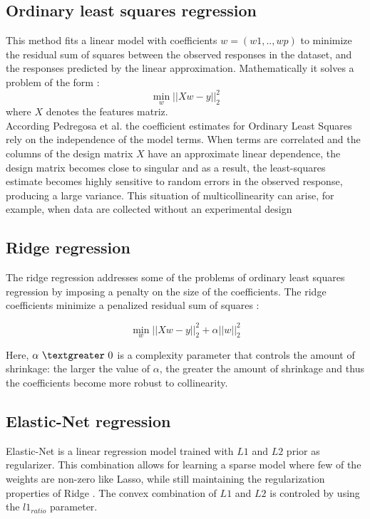 \documentclass[review,authoryear,english]{elsarticle}
\begin{document}
\subsection{Ordinary least squares regression}
This method fits a linear model with coefficients $w = (w1,..,wp)$ to minimize the residual sum of squares between the observed responses in the dataset, and the responses predicted by the linear approximation. Mathematically it solves a problem of the form \citep{scikitlearn2011}:
$$\min_{w} \Bigr| \Bigr| Xw - y \Bigr| \Bigr|_2^2  $$
where $X$ denotes the features matriz. \\
According Pedregosa et al. \citep{scikitlearn2011}  the coefficient estimates for Ordinary Least Squares rely on the independence of the model terms. When terms are correlated and the columns of the design matrix $X$ have an approximate linear dependence, the design matrix becomes close to singular and as a result, the least-squares estimate becomes highly sensitive to random errors in the observed response, producing a large variance. This situation of multicollinearity can arise, for example, when data are collected without an experimental design

\subsection{Ridge regression}
The ridge regression addresses some of the problems of ordinary least squares regression by imposing a penalty on the size of the coefficients. The ridge coefficients minimize a penalized residual sum of squares  \citep{scikitlearn2011}:

$$\min_{w} { \Bigr| \Bigr| Xw - y \Bigr| \Bigr|_2^2  + \alpha \Bigr| \Bigr| w \Bigr| \Bigr|_2^2 } $$

Here, $\alpha \ \textgreater \  0$ is a complexity parameter that controls the amount of shrinkage: the larger the value of $\alpha$, the greater the amount of shrinkage and thus the coefficients become more robust to collinearity.

\subsection{Elastic-Net regression}
Elastic-Net is a linear regression model trained with $L1$ and $L2$ prior as regularizer. This combination allows for learning a sparse model where few of the weights are non-zero like Lasso, while still maintaining the regularization properties of Ridge  \citep{scikitlearn2011}. The convex combination of $L1$ and $L2$ is controled by using the $l1_{ratio}$ parameter.
\end{document}
